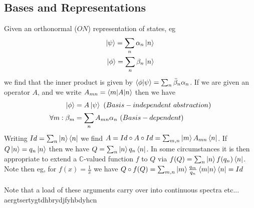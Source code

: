 \documentclass{article}
\begin{document}
\subsection{Bases and Representations}
Given an orthonormal ($ON$) representation of states, eg
\begin{align*}
  \ket\psi=\sum_n\alpha_n\ket n
  \\
  \ket\phi=\sum_n\beta_n\ket n
\end{align*}
we find that the inner product is given by $\braket{\phi|\psi}=\sum_n\bar\beta_n\alpha_n$.  If we are given an operator $A$, and we write $A_{mn}=\braket{m|A|n}$ then we have
\begin{align*}
  \ket \phi&=A\ket\psi~(Basis-independent~abstraction)
  \\
  \forall m :\beta_m&=\sum_nA_{mn}\alpha_n~(Basis-dependent)
\end{align*}
Writing $Id=\sum_n\ket n\bra n$ we find $A=Id\circ A\circ Id=\sum_{m,n}\ket mA_{mn}\bra{n}$.  If $Q\ket n =q_n \ket n$ then we have $Q=\sum_n \ket n q_n \bra n$.  In some circumstances it is then appropriate to extend a $\mathbb C $-valued function $f$ to $Q$ via $f(Q)=\sum_n \ket n f(q_n) \bra n$.  Note then eg, for $f(x)=\frac{1}{x}$ we have $Q\circ f(Q)=\sum_{m,n}\ket m \frac{q_m}{q_n}\braket{m|n}\bra n=Id$
\\
\\
Note that a load of these arguments carry over into continuous spectra etc... aergtsertygtdhbrydjfyhbdyhcn
\end{document}
